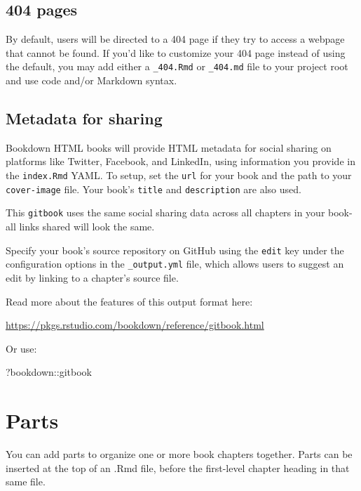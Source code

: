 \documentclass[
]{book}
\newenvironment{Shaded}{\begin{snugshade}}{\end{snugshade}}
\newcommand{\NormalTok}[1]{#1}
\newcommand{\SpecialCharTok}[1]{\textcolor[rgb]{0.00,0.00,0.00}{#1}}
\theoremstyle{definition}
\theoremstyle{definition}
\theoremstyle{definition}
\theoremstyle{definition}
\theoremstyle{remark}
\begin{document}
\hypertarget{pages}{%
\section{404 pages}\label{pages}}

By default, users will be directed to a 404 page if they try to access a webpage that cannot be found. If you'd like to customize your 404 page instead of using the default, you may add either a \texttt{\_404.Rmd} or \texttt{\_404.md} file to your project root and use code and/or Markdown syntax.

\hypertarget{metadata-for-sharing}{%
\section{Metadata for sharing}\label{metadata-for-sharing}}

Bookdown HTML books will provide HTML metadata for social sharing on platforms like Twitter, Facebook, and LinkedIn, using information you provide in the \texttt{index.Rmd} YAML. To setup, set the \texttt{url} for your book and the path to your \texttt{cover-image} file. Your book's \texttt{title} and \texttt{description} are also used.

This \texttt{gitbook} uses the same social sharing data across all chapters in your book- all links shared will look the same.

Specify your book's source repository on GitHub using the \texttt{edit} key under the configuration options in the \texttt{\_output.yml} file, which allows users to suggest an edit by linking to a chapter's source file.

Read more about the features of this output format here:

\url{https://pkgs.rstudio.com/bookdown/reference/gitbook.html}

Or use:

\begin{Shaded}
\begin{Highlighting}[]
\NormalTok{?bookdown}\SpecialCharTok{::}\NormalTok{gitbook}
\end{Highlighting}
\end{Shaded}

\hypertarget{parts}{%
\chapter{Parts}\label{parts}}

You can add parts to organize one or more book chapters together. Parts can be inserted at the top of an .Rmd file, before the first-level chapter heading in that same file.
\end{document}
